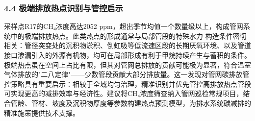 \subsubsection{4.4 极端排放热点识别与管控启示}

采样点R17的CH₄浓度高达2052 ppm，超出季节均值一个数量级以上，构成管网系统中的极端排放热点。此类热点的形成通常与局部管段的特殊水力-构造条件密切相关：管径突变处的沉积物淤积、倒虹吸等低流速区段的长期厌氧环境、以及管道接口渗漏引入的外源有机物，均可在局部形成有利于甲烷持续产生与蓄积的条件。极端热点虽在空间上占比有限，但其对管网总排放的贡献可能极为显著，符合温室气体排放的"二八定律"——少数管段贡献大部分排放量。这一发现对管网碳排放管控策略具有重要启示：相较于全域均匀治理，精准识别并优先管控高排放热点管段可实现更高的减排效率与经济性。建议将CH₄浓度筛查纳入管网巡检常规项目，结合管龄、管材、坡度及沉积物厚度等参数构建热点预测模型，为排水系统碳减排的精准施策提供技术支撑。
